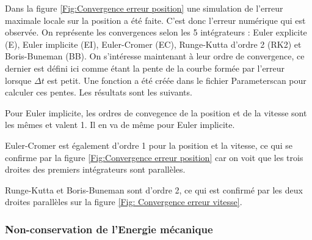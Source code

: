 \documentclass[a4paper,12pt,twoside]{article}
\begin{document}
		Dans la figure \ref{Fig:Convergence erreur position} une simulation de l'erreur maximale locale sur la position a \'et\'e faite. C'est donc l'erreur num\'erique qui est observ\'ee. On repr\'esente les convergences selon les 5 int\'egrateurs : Euler explicite (E), Euler implicite (EI), Euler-Cromer (EC), Runge-Kutta d'ordre 2 (RK2) et Boris-Buneman (BB). On s'int\'eresse maintenant \`a leur ordre de convergence, ce dernier est d\'efini ici comme \'etant la pente de la courbe form\'ee par l'erreur lorsque $\Delta t$ est petit. Une fonction a \'et\'e cr\'e\'ee dans le fichier Parameterscan pour calculer ces pentes. Les résultats sont les suivants.
		
		Pour Euler implicite, les ordres de convegence de la position et de la vitesse sont les m\^emes et valent 1. Il en va de m\^eme pour Euler implicite.
		
		Euler-Cromer est \'egalement d'ordre 1 pour la position et la vitesse, ce qui se confirme par la figure \ref{Fig:Convergence erreur position} car on voit que les trois droites des premiers int\'egrateurs sont parall\`eles. 
		
		Runge-Kutta et Boris-Buneman sont d'ordre 2, ce qui est confirmé par les deux droites parall\`eles sur la figure \ref{Fig: Convergence erreur vitesse}.
		
		
		
		

		\subsubsection{Non-conservation de l'Energie m\'ecanique}
		
\end{document}
